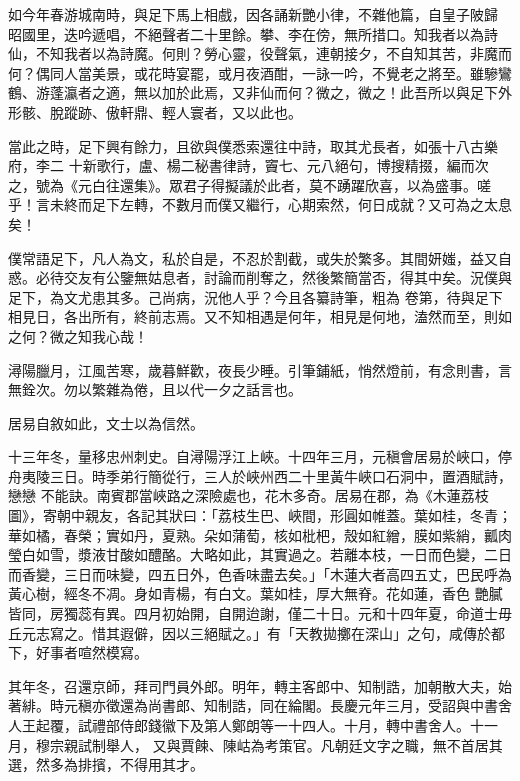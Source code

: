 \begin{pinyinscope}
 如今年春游城南時，與足下馬上相戲，因各誦新艷小律，不雜他篇，自皇子陂歸
 昭國里，迭吟遞唱，不絕聲者二十里餘。攀、李在傍，無所措口。知我者以為詩仙，不知我者以為詩魔。何則？勞心靈，役聲氣，連朝接夕，不自知其苦，非魔而何？偶同人當美景，或花時宴罷，或月夜酒酣，一詠一吟，不覺老之將至。雖驂鸞鶴、游蓬瀛者之適，無以加於此焉，又非仙而何？微之，微之！此吾所以與足下外形骸、脫蹤跡、傲軒鼎、輕人寰者，又以此也。



 當此之時，足下興有餘力，且欲與僕悉索還往中詩，取其尤長者，如張十八古樂府，李二
 十新歌行，盧、楊二秘書律詩，竇七、元八絕句，博搜精掇，編而次之，號為《元白往還集》。眾君子得擬議於此者，莫不踴躍欣喜，以為盛事。嗟乎！言未終而足下左轉，不數月而僕又繼行，心期索然，何日成就？又可為之太息矣！



 僕常語足下，凡人為文，私於自是，不忍於割截，或失於繁多。其間妍媸，益又自惑。必待交友有公鑒無姑息者，討論而削奪之，然後繁簡當否，得其中矣。況僕與足下，為文尤患其多。己尚病，況他人乎？今且各纂詩筆，粗為
 卷第，待與足下相見日，各出所有，終前志焉。又不知相遇是何年，相見是何地，溘然而至，則如之何？微之知我心哉！



 潯陽臘月，江風苦寒，歲暮鮮歡，夜長少睡。引筆鋪紙，悄然燈前，有念則書，言無銓次。勿以繁雜為倦，且以代一夕之話言也。



 居易自敘如此，文士以為信然。



 十三年冬，量移忠州刺史。自潯陽浮江上峽。十四年三月，元稹會居易於峽口，停舟夷陵三日。時季弟行簡從行，三人於峽州西二十里黃牛峽口石洞中，置酒賦詩，戀戀
 不能訣。南賓郡當峽路之深險處也，花木多奇。居易在郡，為《木蓮荔枝圖》，寄朝中親友，各記其狀曰：「荔枝生巴、峽間，形圓如帷蓋。葉如桂，冬青；華如橘，春榮；實如丹，夏熟。朵如蒲萄，核如枇杷，殼如紅繒，膜如紫綃，瓤肉瑩白如雪，漿液甘酸如醴酪。大略如此，其實過之。若離本枝，一日而色變，二日而香變，三日而味變，四五日外，色香味盡去矣。」「木蓮大者高四五丈，巴民呼為黃心樹，經冬不凋。身如青楊，有白文。葉如桂，厚大無脊。花如蓮，香色
 艷膩皆同，房獨蕊有異。四月初始開，自開迨謝，僅二十日。元和十四年夏，命道士毋丘元志寫之。惜其遐僻，因以三絕賦之。」有「天教拋擲在深山」之句，咸傳於都下，好事者喧然模寫。



 其年冬，召還京師，拜司門員外郎。明年，轉主客郎中、知制誥，加朝散大夫，始著緋。時元稹亦徵還為尚書郎、知制誥，同在綸閣。長慶元年三月，受詔與中書舍人王起覆，試禮部侍郎錢徽下及第人鄭朗等一十四人。十月，轉中書舍人。十一月，穆宗親試制舉人，
 又與賈餗、陳岵為考策官。凡朝廷文字之職，無不首居其選，然多為排擯，不得用其才。




\end{pinyinscope}

